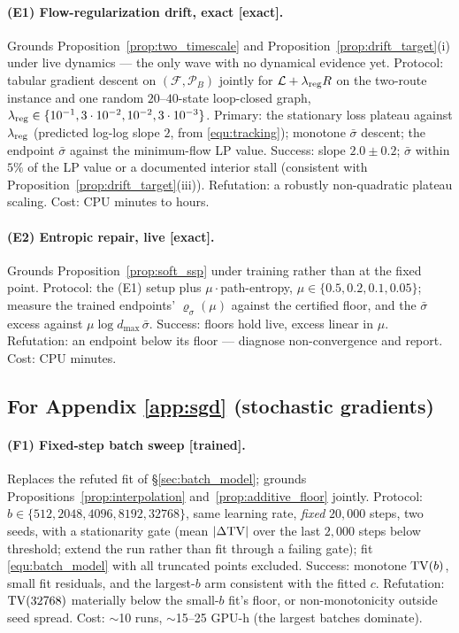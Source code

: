 \paragraph{(E1) Flow-regularization drift, exact [exact].}
Grounds Proposition~\ref{prop:two_timescale} and Proposition~\ref{prop:drift_target}(i)
under live dynamics --- the only wave with no dynamical evidence yet. Protocol: tabular
gradient descent on $(\mathcal F,\mathcal P_B)$ jointly for
$\mathcal L+\lambda_{\mathrm{reg}}{}R$ on the two-route instance and one random
$20$--$40$-state loop-closed graph, $\lambda_{\mathrm{reg}}\in\{10^{-1},3\cdot10^{-2},
10^{-2},3\cdot10^{-3}\}$. Primary: the stationary loss plateau against
$\lambda_{\mathrm{reg}}$ (predicted log-log slope $2$, from \eqref{equ:tracking});
monotone $\bar\sigma$ descent; the endpoint $\bar\sigma$ against the minimum-flow LP
value. Success: slope $2.0\pm0.2$; $\bar\sigma$ within $5\%$ of the LP value or a
documented interior stall (consistent with Proposition~\ref{prop:drift_target}(iii)).
Refutation: a robustly non-quadratic plateau scaling. Cost: CPU minutes to hours.

\paragraph{(E2) Entropic repair, live [exact].}
Grounds Proposition~\ref{prop:soft_ssp} under training rather than at the fixed point.
Protocol: the (E1) setup plus $\mu\cdot$path-entropy,
$\mu\in\{0.5,0.2,0.1,0.05\}$; measure the trained endpoints' $\varrho_\sigma(\mu)$
against the certified floor, and the $\bar\sigma$ excess against
$\mu\log d_{\max}\,\bar\sigma$. Success: floors hold live, excess linear in $\mu$.
Refutation: an endpoint below its floor --- diagnose non-convergence and report. Cost:
CPU minutes.

\subsection{For Appendix \ref{app:sgd} (stochastic gradients)}

\paragraph{(F1) Fixed-step batch sweep [trained].}
Replaces the refuted fit of \S\ref{sec:batch_model}; grounds
Propositions~\ref{prop:interpolation} and~\ref{prop:additive_floor} jointly. Protocol:
$b\in\{512, 2048, 4096, 8192, 32768\}$, same learning rate, \emph{fixed} $20{,}000$
steps, two seeds, with a stationarity gate (mean $|\Delta\mathrm{TV}|$ over the last $2{,}000$
steps below threshold; extend the run rather than fit through a failing gate); fit
\eqref{equ:batch_model} with all truncated points excluded. Success: monotone $\mathrm{TV}(b)$,
small fit residuals, and the largest-$b$ arm consistent with the fitted $c$. Refutation:
$\mathrm{TV}(32768)$ materially below the small-$b$ fit's floor, or non-monotonicity outside
seed spread. Cost: $\sim$10 runs, $\sim$15--25 GPU-h (the largest batches dominate).

